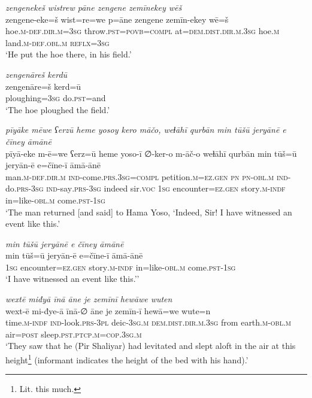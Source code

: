 \ea \label{ŽP.52}
\textit{zengenekeš wistrew pāne zengene zemīnekey wēš} \\ 
\gll zengene-eke=š wist=re=we p=āne zengene zemīn-ekey wē=š \\ 
 hoe\textsc{.m}\textsc{-def}\textsc{.dir}\textsc{.m}\textsc{=3sg} throw\textsc{.pst}\textsc{=\textsc{povb}}\textsc{=compl} at=\textsc{dem.dist}\textsc{.dir}\textsc{.m}\textsc{.3sg} hoe\textsc{.m} land\textsc{.m}\textsc{-def}\textsc{.obl}\textsc{.m} \textsc{reflx}\textsc{=3sg} \\ 
\glt `He put the hoe there, in his field.'
\z 
 
\ea \label{ŽP.53}
\textit{zengenāreš kerdū} \\ 
\gll zengenāre=š kerd=ū \\ 
 ploughing\textsc{=3sg} do\textsc{.pst}=and \\ 
\glt `The hoe ploughed the field.'
\z 
 
\ea \label{ŽP.57}
\textit{pīyāke mēwe ʕerzū heme yosoy kero māčo, weɫāhī qurbān min tūšū jeryānē e čīney āmānē} \\ 
\gll pīyā-eke m-ē=we ʕerz=ū heme yoso-ī ∅-ker-o m-āč-o weɫāhī qurbān min tūš=ū jeryān-ē e=čīne-ī āmā-ānē \\ 
 man\textsc{.m}\textsc{-def}\textsc{.dir}\textsc{.m} \textsc{ind-}come\textsc{.prs}\textsc{.3sg}\textsc{=compl} petition\textsc{.m}\textsc{\textsc{=ez.gen}} \textsc{pn} \textsc{pn}\textsc{-obl}\textsc{.m} \textsc{ind-}do\textsc{.prs}\textsc{-3sg} \textsc{ind-}say\textsc{.prs}\textsc{-3sg} indeed sir.\textsc{voc} \textsc{1sg} encounter\textsc{\textsc{=ez.gen}} story\textsc{.m}\textsc{-indf} in=like\textsc{-obl}\textsc{.m} come\textsc{.pst}\textsc{-\textsc{1sg}} \\ 
\glt `The man returned [and said] to Hama Yoso, ‘Indeed, Sir! I have witnessed an event like this.'
\z 
 
\ea \label{ŽP.58}
\textit{min tūšū jeryānē e čīney āmānē} \\ 
\gll min tūš=ū jeryān-ē e=čīne-ī āmā-ānē \\ 
 \textsc{1sg} encounter\textsc{\textsc{=ez.gen}} story\textsc{.m}\textsc{-indf} in=like\textsc{-obl}\textsc{.m} come\textsc{.pst}\textsc{-\textsc{1sg}} \\ 
\glt `I have witnessed an event like this.’'
\z 
 
\ea \label{ŽP.68}
\textit{wextē miđyā īnā āne je zemīnī hewāwe wuten} \\ 
\gll wext-ē mi-đye-ā īnā-∅ āne je zemīn-ī hewā=we wute=n \\ 
 time\textsc{.m}\textsc{-indf} \textsc{ind-}look\textsc{.prs}\textsc{-3pl} deic\textsc{-3sg}\textsc{.m} \textsc{dem.dist}\textsc{.dir}\textsc{.m}\textsc{.3sg} from earth\textsc{.m}\textsc{-obl}\textsc{.m} air\textsc{=\textsc{post}} sleep\textsc{.pst}\textsc{.ptcp}\textsc{.m}\textsc{=cop}\textsc{.3sg}\textsc{.m} \\ 
\glt `They saw that he (Pir Shaliyar) had levitated and slept aloft in the air at this height\footnote{Lit. this much.} (informant indicates the height of the bed with his hand).'
\z 
 
